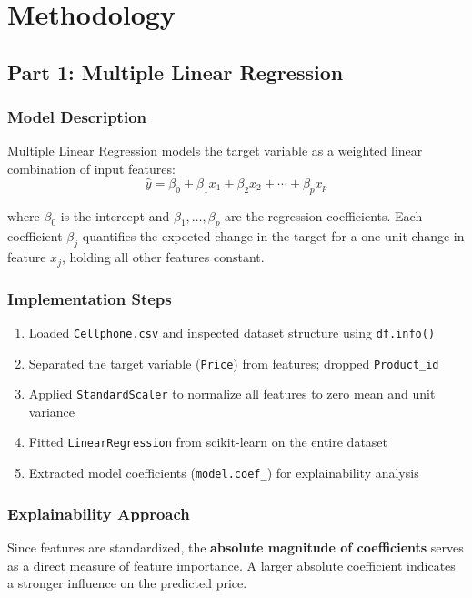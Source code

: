 \documentclass[12pt,a4paper]{article}
\begin{document}
\section{Methodology}

\subsection{Part 1: Multiple Linear Regression}

\subsubsection{Model Description}
Multiple Linear Regression models the target variable as a weighted linear combination of input features:
\begin{equation}
    \hat{y} = \beta_0 + \beta_1 x_1 + \beta_2 x_2 + \cdots + \beta_p x_p
\end{equation}

where $\beta_0$ is the intercept and $\beta_1, \ldots, \beta_p$ are the regression coefficients. Each coefficient $\beta_j$ quantifies the expected change in the target for a one-unit change in feature $x_j$, holding all other features constant.

\subsubsection{Implementation Steps}
\begin{enumerate}
    \item Loaded \texttt{Cellphone.csv} and inspected dataset structure using \texttt{df.info()}
    \item Separated the target variable (\texttt{Price}) from features; dropped \texttt{Product\_id}
    \item Applied \texttt{StandardScaler} to normalize all features to zero mean and unit variance
    \item Fitted \texttt{LinearRegression} from scikit-learn on the entire dataset
    \item Extracted model coefficients (\texttt{model.coef\_}) for explainability analysis
\end{enumerate}

\subsubsection{Explainability Approach}
Since features are standardized, the \textbf{absolute magnitude of coefficients} serves as a direct measure of feature importance. A larger absolute coefficient indicates a stronger influence on the predicted price.
\end{document}
